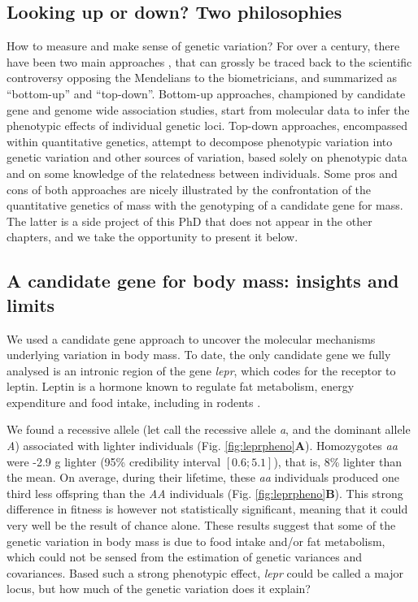 \subsection{Looking up or down? Two philosophies}
How to measure and make sense of genetic variation?
For over a century, there have been two main approaches \parencite{Liedvogel2012}, that can grossly be traced back to the scientific controversy opposing the Mendelians to the biometricians, and summarized as ``bottom-up'' and ``top-down''. 
Bottom-up approaches, championed by candidate gene and genome wide association studies, start from molecular data to infer the phenotypic effects of individual genetic loci. 
Top-down approaches, encompassed within quantitative genetics, attempt to decompose phenotypic variation into genetic variation and other sources of variation, based solely on phenotypic data and on some knowledge of the relatedness between individuals. 
Some pros and cons of both approaches are nicely illustrated by the confrontation of the quantitative genetics of mass with the genotyping of a candidate gene for mass. The latter is a side project of this PhD that does not appear in the other chapters, and we take the opportunity to present it below.

\subsection{A candidate gene for body mass: insights and limits}
We used a candidate gene approach \parencite{Fitzpatrick2005} to uncover the molecular mechanisms underlying variation in body mass. To date, the only candidate gene we fully analysed is an intronic region of the gene \emph{lepr}, which codes for the receptor to leptin. Leptin is a hormone known to regulate fat metabolism, energy expenditure and food intake, including in rodents \parencite{Houseknecht1998}.

We found a recessive allele (let call the recessive allele \emph{a}, and the dominant allele \emph{A}) associated with lighter individuals (Fig. \ref{fig:leprpheno}\textbf{A}). Homozygotes \emph{aa} were -2.9 g lighter (95\% credibility interval $[0.6;5.1]$), that is, 8\% lighter than the mean. On average, during their lifetime, these \emph{aa} individuals produced one third less offspring than the \emph{AA} individuals (Fig. \ref{fig:leprpheno}\textbf{B}). This strong difference in fitness is however not statistically significant, meaning that it could very well be the result of chance alone. These results suggest that some of the genetic variation in body mass is due to food intake and/or fat metabolism, which could not be sensed from the estimation of genetic variances and covariances. 
Based such a strong phenotypic effect, \emph{lepr} could be called a major locus, but how much of the genetic variation does it explain?

